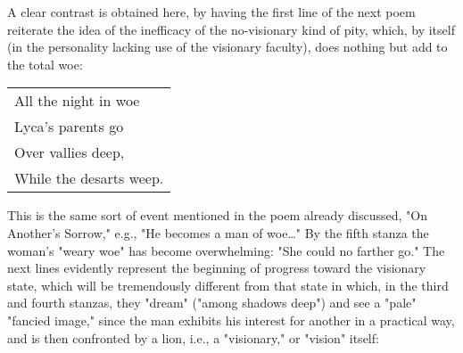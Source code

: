 A clear contrast is obtained here, by having the first line of the next poem reiterate the idea of the inefficacy of the 
no-visionary kind of pity, which, by itself (in the personality lacking use of the visionary faculty), does nothing but add to the total woe:\par
\begin{center}
	\begin{tabular}{l}
		All the night in woe \\
		Lyca's parents go    \\
		Over vallies deep,   \\
		While the desarts weep.
	\end{tabular}
\end{center}
\hspace*{5mm}This is the same sort of event mentioned in the poem already discussed, "On Another's Sorrow," e.g., "He becomes
a man of woe\dots" By the fifth stanza the woman's "weary woe" has become overwhelming: "She could no farther go."
The next lines evidently represent the beginning of progress toward the visionary state, which will be tremendously different from
that state in which, in the third and fourth stanzas, they "dream" ("among shadows deep") and see a "pale" "fancied image," since
the man exhibits his interest for another in a practical way, and is then confronted by a lion, i.e., a "visionary," or "vision" itself:\par

\newpage

